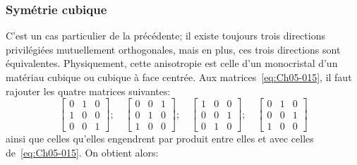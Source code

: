 \subsubsection{Symétrie cubique}
C'est un cas particulier de la précédente; il existe toujours trois directions privilégiées mutuellement orthogonales, mais en plus, ces trois directions sont équivalentes.
Physiquement, cette anisotropie est celle d'un monocristal d'un matériau cubique ou cubique à face centrée.
Aux matrices~\eqref{eq:Ch05-015}, il faut rajouter les quatre matrices suivantes:
\begin{equation}
    \begin{bmatrix}
        0 & 1 & 0 \\
        1 & 0 & 0 \\
        0 & 0 & 1
    \end{bmatrix};
    \quad
    \begin{bmatrix}
        0 & 0 & 1 \\
        0 & 1 & 0 \\
        1 & 0 & 0
    \end{bmatrix};
    \quad
    \begin{bmatrix}
        1 & 0 & 0 \\
        0 & 0 & 1 \\
        0 & 1 & 0
    \end{bmatrix};
    \quad
    \begin{bmatrix}
        0 & 1 & 0 \\
        0 & 0 & 1 \\
        1 & 0 & 0
    \end{bmatrix}
    \label{eq:Ch05-017}
\end{equation}
ainsi que celles qu'elles engendrent par produit entre elles et avec celles de~\eqref{eq:Ch05-015}.
On obtient alors:
